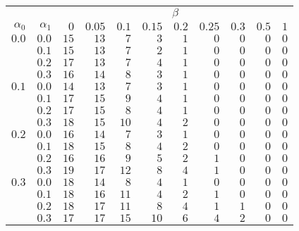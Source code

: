\begin{tabular}{rr|rrrrrrrrr}
\hline\hline
 && \multicolumn{9}{c}{$\beta$}\\
 $\alpha_0$ & $\alpha_1$ & $0$ & $0.05$ & $0.1$ & $0.15$ & $0.2$ & $0.25$ & $0.3$ & $0.5$ & $1$ \\ 
 \hline
$0.0$ & $0.0$ & $15$ & $13$ & $7$ & $3$ & $1$ & $0$ & $0$ & $0$ & $0$\\ 
 & $0.1$ & $15$ & $13$ & $7$ & $2$ & $1$ & $0$ & $0$ & $0$ & $0$\\ 
 & $0.2$ & $17$ & $13$ & $7$ & $4$ & $1$ & $0$ & $0$ & $0$ & $0$\\ 
 & $0.3$ & $16$ & $14$ & $8$ & $3$ & $1$ & $0$ & $0$ & $0$ & $0$\\ 
\hline 
 $0.1$ & $0.0$ & $14$ & $13$ & $7$ & $3$ & $1$ & $0$ & $0$ & $0$ & $0$\\ 
 & $0.1$ & $17$ & $15$ & $9$ & $4$ & $1$ & $0$ & $0$ & $0$ & $0$\\ 
 & $0.2$ & $17$ & $15$ & $8$ & $4$ & $1$ & $0$ & $0$ & $0$ & $0$\\ 
 & $0.3$ & $18$ & $15$ & $10$ & $4$ & $2$ & $0$ & $0$ & $0$ & $0$\\ 
\hline 
 $0.2$ & $0.0$ & $16$ & $14$ & $7$ & $3$ & $1$ & $0$ & $0$ & $0$ & $0$\\ 
 & $0.1$ & $18$ & $15$ & $8$ & $4$ & $2$ & $0$ & $0$ & $0$ & $0$\\ 
 & $0.2$ & $16$ & $16$ & $9$ & $5$ & $2$ & $1$ & $0$ & $0$ & $0$\\ 
 & $0.3$ & $19$ & $17$ & $12$ & $8$ & $4$ & $1$ & $0$ & $0$ & $0$\\ 
\hline 
 $0.3$ & $0.0$ & $18$ & $14$ & $8$ & $4$ & $1$ & $0$ & $0$ & $0$ & $0$\\ 
 & $0.1$ & $18$ & $16$ & $11$ & $4$ & $2$ & $1$ & $0$ & $0$ & $0$\\ 
 & $0.2$ & $18$ & $17$ & $11$ & $8$ & $4$ & $1$ & $1$ & $0$ & $0$\\ 
 & $0.3$ & $17$ & $17$ & $15$ & $10$ & $6$ & $4$ & $2$ & $0$ & $0$\\ 
 \hline 
 \end{tabular}